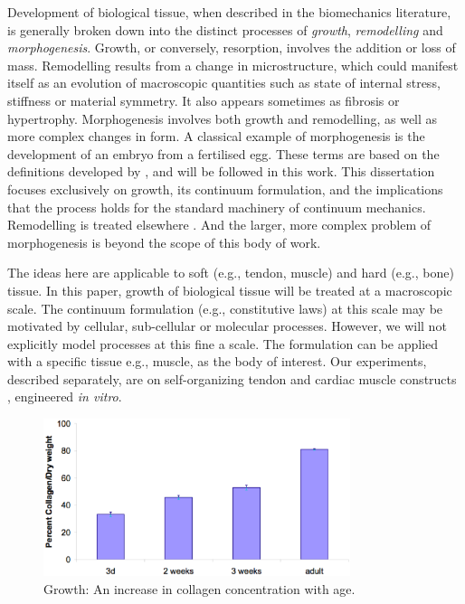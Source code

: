 Development of biological tissue, when described in the biomechanics
literature, is generally broken down into the distinct processes of
\emph{growth}, \emph{remodelling} and \emph{morphogenesis}. Growth, or
conversely, resorption, involves the addition or loss of
mass. Remodelling results from a change in microstructure, which could
manifest itself as an evolution of macroscopic quantities such as
state of internal stress, stiffness or material symmetry. It also
appears sometimes as fibrosis or hypertrophy. Morphogenesis involves
both growth and remodelling, as well as more complex changes in
form. A classical example of morphogenesis is the development of an
embryo from a fertilised egg. These terms are based on the definitions
developed by \cite{Taber:95}, and will be followed in this work. This
dissertation focuses exclusively on growth, its continuum formulation,
and the implications that the process holds for the standard machinery
of continuum mechanics. Remodelling is treated elsewhere
\citep{remodelpaper}. And the larger, more complex problem of
morphogenesis is beyond the scope of this body of work.

The ideas here are applicable to soft (e.g., tendon, muscle) and
hard (e.g., bone) tissue. In this paper, growth of biological
tissue will be treated at a macroscopic scale. The continuum
formulation (e.g., constitutive laws) at this scale may be
motivated by cellular, sub-cellular or molecular processes.
However, we will not explicitly model processes at this fine a
scale. The formulation can be applied with a specific tissue e.g.,
muscle, as the body of interest. Our experiments, described
separately, are on self-organizing tendon \citep{Calve:04}
and cardiac muscle constructs \citep{Baaretal:2003}, engineered
{\it in vitro}.

\begin{figure}[!hpt]
\centering
\includegraphics[width=0.8\textwidth]
                {images/experiments/content-evolution} 
\caption{Growth: An increase in collagen concentration with age.}
\label{content-evolution}
\end{figure}

